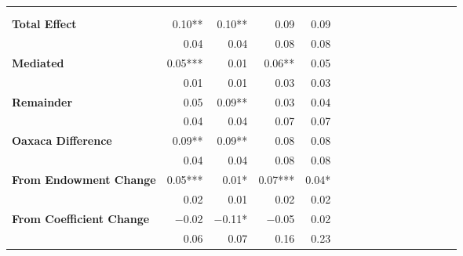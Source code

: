 \begin{tabular}{@{\extracolsep{5pt}}lrrrrrrrrrrrrrrr}
\toprule
&  &  &  &  \\
{\bf } &  &  &  &  \\
\hline
{\bf Total Effect} & 0.10**\phantom{*} & 0.10**\phantom{*} & 0.09\phantom{***} & 0.09\phantom{***} \\
{\bf  } & 0.04\phantom{***} & 0.04\phantom{***} & 0.08\phantom{***} & 0.08\phantom{***} \\
{\bf Mediated} & 0.05*** & 0.01\phantom{***} & 0.06**\phantom{*} & 0.05\phantom{***} \\
{\bf  } & 0.01\phantom{***} & 0.01\phantom{***} & 0.03\phantom{***} & 0.03\phantom{***} \\
{\bf Remainder} & 0.05\phantom{***} & 0.09**\phantom{*} & 0.03\phantom{***} & 0.04\phantom{***} \\
{\bf  } & 0.04\phantom{***} & 0.04\phantom{***} & 0.07\phantom{***} & 0.07\phantom{***} \\
{\bf Oaxaca Difference} & 0.09**\phantom{*} & 0.09**\phantom{*} & 0.08\phantom{***} & 0.08\phantom{***} \\
{\bf  } & 0.04\phantom{***} & 0.04\phantom{***} & 0.08\phantom{***} & 0.08\phantom{***} \\
{\bf From Endowment Change} & 0.05*** & 0.01*\phantom{**} & 0.07*** & 0.04*\phantom{**} \\
{\bf  } & 0.02\phantom{***} & 0.01\phantom{***} & 0.02\phantom{***} & 0.02\phantom{***} \\
{\bf From Coefficient Change} & $-$0.02\phantom{***} & $-$0.11*\phantom{**} & $-$0.05\phantom{***} & 0.02\phantom{***} \\
{\bf  } & 0.06\phantom{***} & 0.07\phantom{***} & 0.16\phantom{***} & 0.23\phantom{***} \\
\hline
\end{tabular}

